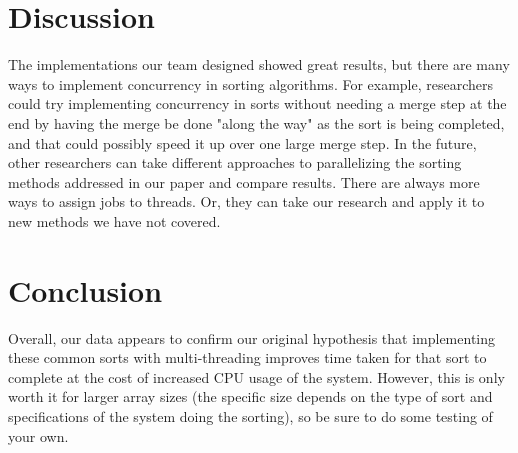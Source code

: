 \documentclass[conference]{IEEEtran}
\begin{document}
\section{Discussion}
The implementations our team designed showed great results, but there are many ways to implement concurrency in sorting algorithms. For example, researchers could try implementing concurrency in sorts without needing a merge step at the end by having the merge be done "along the way" as the sort is being completed, and that could possibly speed it up over one large merge step. In the future, other researchers can take different approaches to parallelizing the sorting methods addressed in our paper and compare results. There are always more ways to assign jobs to threads. Or, they can take our research and apply it to new methods we have not covered.

\section{Conclusion}
Overall, our data appears to confirm our original hypothesis that implementing these common sorts with multi-threading improves time taken for that sort to complete at the cost of increased CPU usage of the system. However, this is only worth it for larger array sizes (the specific size depends on the type of sort and specifications of the system doing the sorting), so be sure to do some testing of your own.
\end{document}
